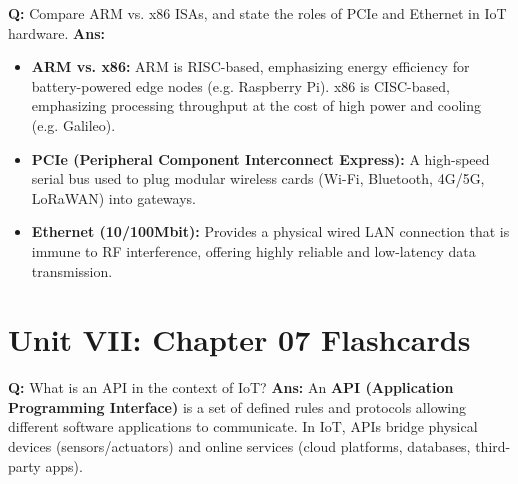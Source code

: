 \documentclass[10pt,a4paper,twocolumn]{article}
\begin{document}
\begin{tcolorbox}[
  colback=white,
  colframe=UnitColorSix,
  colbacktitle=gray!10!white,
  coltitle=black,
  fonttitle=\bfseries\sffamily\small,
  title={Unit VI $\bullet$ Card 13},
  boxrule=1.2pt,
  arc=2mm,
  outer arc=2mm,
  boxsep=1.5mm,
  top=1mm,
  bottom=1mm,
  left=1.5mm,
  right=1.5mm,
  before skip=2.5mm,
  after skip=2.5mm
]
\textbf{Q:} Compare ARM vs. x86 ISAs, and state the roles of PCIe and Ethernet in IoT hardware.
\tcbline
\textbf{Ans:} \begin{itemize}
  \item \textbf{ARM vs. x86:} ARM is RISC-based, emphasizing energy efficiency for battery-powered edge nodes (e.g. Raspberry Pi). x86 is CISC-based, emphasizing processing throughput at the cost of high power and cooling (e.g. Galileo).
  \item \textbf{PCIe (Peripheral Component Interconnect Express):} A high-speed serial bus used to plug modular wireless cards (Wi-Fi, Bluetooth, 4G/5G, LoRaWAN) into gateways.
  \item \textbf{Ethernet (10/100Mbit):} Provides a physical wired LAN connection that is immune to RF interference, offering highly reliable and low-latency data transmission.
\end{itemize}
\end{tcolorbox}

\section*{Unit VII: Chapter 07 Flashcards}

\begin{tcolorbox}[
  colback=white,
  colframe=UnitColorSeven,
  colbacktitle=gray!10!white,
  coltitle=black,
  fonttitle=\bfseries\sffamily\small,
  title={Unit VII $\bullet$ Card 1},
  boxrule=1.2pt,
  arc=2mm,
  outer arc=2mm,
  boxsep=1.5mm,
  top=1mm,
  bottom=1mm,
  left=1.5mm,
  right=1.5mm,
  before skip=2.5mm,
  after skip=2.5mm
]
\textbf{Q:} What is an API in the context of IoT?
\tcbline
\textbf{Ans:} An \textbf{API (Application Programming Interface)} is a set of defined rules and protocols allowing different software applications to communicate. In IoT, APIs bridge physical devices (sensors/actuators) and online services (cloud platforms, databases, third-party apps).
\end{tcolorbox}
\end{document}

